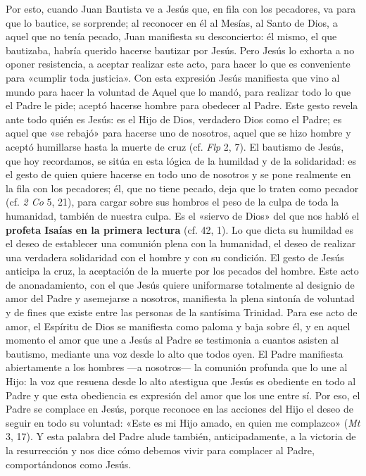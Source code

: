 \documentclass[]{article}
\begin{document}
Por esto, cuando Juan Bautista ve a Jesús que, en fila con los
pecadores, va para que lo bautice, se sorprende; al reconocer en él al
Mesías, al Santo de Dios, a aquel que no tenía pecado, Juan manifiesta
su desconcierto: él mismo, el que bautizaba, habría querido hacerse
bautizar por Jesús. Pero Jesús lo exhorta a no oponer resistencia, a
aceptar realizar este acto, para hacer lo que es conveniente para
«cumplir toda justicia». Con esta expresión Jesús manifiesta que vino al
mundo para hacer la voluntad de Aquel que lo mandó, para realizar todo
lo que el Padre le pide; aceptó hacerse hombre para obedecer al Padre.
Este gesto revela ante todo quién es Jesús: es el Hijo de Dios,
verdadero Dios como el Padre; es aquel que «se rebajó» para hacerse uno
de nosotros, aquel que se hizo hombre y aceptó humillarse hasta la
muerte de cruz (cf. \emph{Flp} 2, 7). El bautismo de Jesús, que hoy
recordamos, se sitúa en esta lógica de la humildad y de la solidaridad:
es el gesto de quien quiere hacerse en todo uno de nosotros y se pone
realmente en la fila con los pecadores; él, que no tiene pecado, deja
que lo traten como pecador (cf. \emph{2 Co} 5, 21), para cargar sobre
sus hombros el peso de la culpa de toda la humanidad, también de nuestra
culpa. Es el «siervo de Dios» del que nos habló el \textbf{profeta
Isaías en la primera lectura} (cf. 42, 1). Lo que dicta su humildad es
el deseo de establecer una comunión plena con la humanidad, el deseo de
realizar una verdadera solidaridad con el hombre y con su condición. El
gesto de Jesús anticipa la cruz, la aceptación de la muerte por los
pecados del hombre. Este acto de anonadamiento, con el que Jesús quiere
uniformarse totalmente al designio de amor del Padre y asemejarse a
nosotros, manifiesta la plena sintonía de voluntad y de fines que existe
entre las personas de la santísima Trinidad. Para ese acto de amor, el
Espíritu de Dios se manifiesta como paloma y baja sobre él, y en aquel
momento el amor que une a Jesús al Padre se testimonia a cuantos asisten
al bautismo, mediante una voz desde lo alto que todos oyen. El Padre
manifiesta abiertamente a los hombres ---a nosotros--- la comunión
profunda que lo une al Hijo: la voz que resuena desde lo alto atestigua
que Jesús es obediente en todo al Padre y que esta obediencia es
expresión del amor que los une entre sí. Por eso, el Padre se complace
en Jesús, porque reconoce en las acciones del Hijo el deseo de seguir en
todo su voluntad: «Este es mi Hijo amado, en quien me complazco»
(\emph{Mt} 3, 17). Y esta palabra del Padre alude también,
anticipadamente, a la victoria de la resurrección y nos dice cómo
debemos vivir para complacer al Padre, comportándonos como Jesús.
\end{document}
